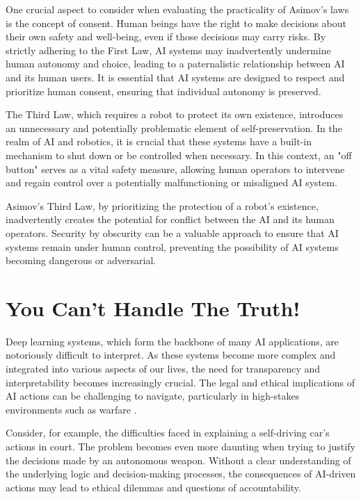 One crucial aspect to consider when evaluating the practicality of Asimov's laws is the concept of consent. Human beings have the right to make decisions about their own safety and well-being, even if those decisions may carry risks. By strictly adhering to the First Law, AI systems may inadvertently undermine human autonomy and choice, leading to a paternalistic relationship between AI and its human users. It is essential that AI systems are designed to respect and prioritize human consent, ensuring that individual autonomy is preserved.

The Third Law, which requires a robot to protect its own existence, introduces an unnecessary and potentially problematic element of self-preservation. In the realm of AI and robotics, it is crucial that these systems have a built-in mechanism to shut down or be controlled when necessary. In this context, an "off button" serves as a vital safety measure, allowing human operators to intervene and regain control over a potentially malfunctioning or misaligned AI system.

Asimov's Third Law, by prioritizing the protection of a robot's existence, inadvertently creates the potential for conflict between the AI and its human operators. Security by obscurity can be a valuable approach to ensure that AI systems remain under human control, preventing the possibility of AI systems becoming dangerous or adversarial.

\section{You Can't Handle The Truth!}

Deep learning systems, which form the backbone of many AI applications, are notoriously difficult to interpret. As these systems become more complex and integrated into various aspects of our lives, the need for transparency and interpretability becomes increasingly crucial. The legal and ethical implications of AI actions can be challenging to navigate, particularly in high-stakes environments such as warfare \cite{saferalgorithmicsystems}.

Consider, for example, the difficulties faced in explaining a self-driving car's actions in court. The problem becomes even more daunting when trying to justify the decisions made by an autonomous weapon. Without a clear understanding of the underlying logic and decision-making processes, the consequences of AI-driven actions may lead to ethical dilemmas and questions of accountability.

